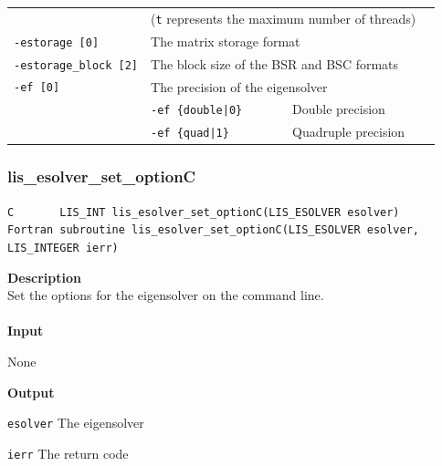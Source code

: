 \documentclass[a4paper]{article}
\newcommand{\namelistlabel}[1]{\mbox{#1}\hfill}
\newenvironment{namelist}[1]{%
\begin{list}{}
  {\let\makelabel\namelistlabel
  \settowidth{\labelwidth}{#1}
  \setlength{\leftmargin}{1.1\labelwidth}}
  }{%
\end{list}}
\begin{document}
\begin{minipage}[t]{\textwidth}
\begin{center}
\begin{tabular}{l|ll}
                            & (\verb=t= represents the maximum number of
 threads) \\
\verb=-estorage [0]=   & The matrix storage format \\
\verb=-estorage_block [2]=& The block size of the BSR and BSC formats\\ 
\verb=-ef [0]=         & The precision of the eigensolver\\
                       & \verb=-ef {double|0}       =  Double precision \\ 
                       & \verb=-ef {quad|1}         =  Quadruple precision \\
\hline         
\end{tabular}
\end{center}
\end{minipage}

\newpage
\subsubsection{lis\_esolver\_set\_optionC}
\begin{screen}
\verb|C       LIS_INT lis_esolver_set_optionC(LIS_ESOLVER esolver)|\\
\verb|Fortran subroutine lis_esolver_set_optionC(LIS_ESOLVER esolver, LIS_INTEGER ierr)|
\end{screen}
{\bf Description}\\
\indent
Set the options for the eigensolver on the command line.
\\ \\
\noindent
{\bf Input}
\begin{namelist}{XXXXXXXXXXXXXXXXXXXX}
\item[None]
\end{namelist}
{\bf Output}
\begin{namelist}{XXXXXXXXXXXXXXXXXXXX}
\item[\tt esolver] The eigensolver
\item[\tt ierr] The return code
\end{namelist}

\newpage
\end{document}
